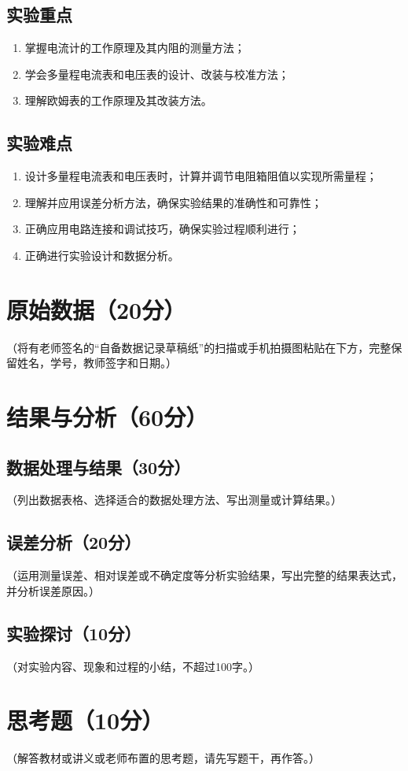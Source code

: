 \documentclass[]{../template/Report}
\begin{document}
\subsection{实验重点}
\begin{enumerate}
    \item 掌握电流计的工作原理及其内阻的测量方法；
    \item 学会多量程电流表和电压表的设计、改装与校准方法；
    \item 理解欧姆表的工作原理及其改装方法。
\end{enumerate}
\subsection{实验难点}
\begin{enumerate}
    \item 设计多量程电流表和电压表时，计算并调节电阻箱阻值以实现所需量程；
    \item 理解并应用误差分析方法，确保实验结果的准确性和可靠性；
    \item 正确应用电路连接和调试技巧，确保实验过程顺利进行；
    \item 正确进行实验设计和数据分析。
\end{enumerate}
\begin{fullreportonly}
    \section{原始数据（20分）}
（将有老师签名的“自备数据记录草稿纸”的扫描或手机拍摄图粘贴在下方，完整保留姓名，学号，教师签字和日期。）

\section{结果与分析（60分）}
\subsection{数据处理与结果（30分）}
（列出数据表格、选择适合的数据处理方法、写出测量或计算结果。）

\subsection{误差分析（20分）}
（运用测量误差、相对误差或不确定度等分析实验结果，写出完整的结果表达式，并分析误差原因。）

\subsection{实验探讨（10分）}
（对实验内容、现象和过程的小结，不超过100字。）

\section{思考题（10分）}
（解答教材或讲义或老师布置的思考题，请先写题干，再作答。）
\end{fullreportonly}
\insertnotes
\end{document}
